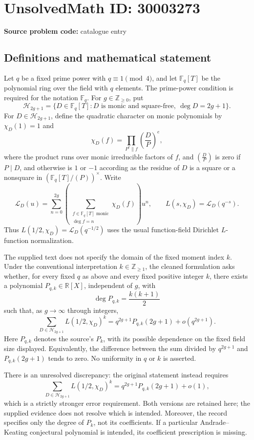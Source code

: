 \documentclass[11pt]{article}
\newcommand{\Z}{\mathbb{Z}}
\newcommand{\R}{\mathbb{R}}
\newcommand{\F}{\mathbb{F}}
\begin{document}
\section*{UnsolvedMath ID: 30003273}
\textbf{Source problem code:} catalogue entry
\subsection{Definitions and mathematical statement}
Let \(q\) be a fixed prime power with \(q\equiv1\pmod4\), and let \(\F_q[T]\) be the polynomial ring over the field with \(q\) elements. The prime-power condition is required for the notation \(\F_q\). For \(g\in\Z_{\ge0}\), put
\[
\mathcal H_{2g+1}=\{D\in\F_q[T]:D\text{ is monic and square-free},\ \deg D=2g+1\}.
\]
For \(D\in\mathcal H_{2g+1}\), define the quadratic character on monic polynomials by \(\chi_D(1)=1\) and
\[
\chi_D(f)=\prod_{P^e\parallel f}\left(\frac{D}{P}\right)^e,
\]
where the product runs over monic irreducible factors of \(f\), and \(\left(\frac{D}{P}\right)\) is zero if \(P\mid D\), and otherwise is \(1\) or \(-1\) according as the residue of \(D\) is a square or a nonsquare in \((\F_q[T]/(P))^\times\). Write
\[
\mathcal L_D(u)=\sum_{n=0}^{2g}\left(\sum_{\substack{f\in\F_q[T]\text{ monic}\\\deg f=n}}\chi_D(f)\right)u^n,
\qquad L(s,\chi_D)=\mathcal L_D(q^{-s}).
\]
Thus \(L(1/2,\chi_D)=\mathcal L_D(q^{-1/2})\) uses the usual function-field Dirichlet \(L\)-function normalization.

The supplied text does not specify the domain of the fixed moment index \(k\). Under the conventional interpretation \(k\in\Z_{\ge1}\), the cleaned formulation asks whether, for every fixed \(q\) as above and every fixed positive integer \(k\), there exists a polynomial \(P_{q,k}\in\R[X]\), independent of \(g\), with
\[
\deg P_{q,k}=\frac{k(k+1)}2
\]
such that, as \(g\to\infty\) through integers,
\[
\sum_{D\in\mathcal H_{2g+1}}L(1/2,\chi_D)^k
=q^{2g+1}P_{q,k}(2g+1)+o(q^{2g+1}).
\]
Here \(P_{q,k}\) denotes the source's \(P_k\), with its possible dependence on the fixed field size displayed. Equivalently, the difference between the sum divided by \(q^{2g+1}\) and \(P_{q,k}(2g+1)\) tends to zero. No uniformity in \(q\) or \(k\) is asserted.

There is an unresolved discrepancy: the original statement instead requires
\[
\sum_{D\in\mathcal H_{2g+1}}L(1/2,\chi_D)^k
=q^{2g+1}P_{q,k}(2g+1)+o(1),
\]
which is a strictly stronger error requirement. Both versions are retained here; the supplied evidence does not resolve which is intended. Moreover, the record specifies only the degree of \(P_k\), not its coefficients. If a particular Andrade--Keating conjectural polynomial is intended, its coefficient prescription is missing.
\end{document}
